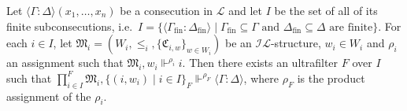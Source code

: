 \documentclass[submission,copyright,creativecommons]{eptcs}
\newcommand{\mo}{\mathfrak}
\newcommand{\finset}{_\mathrm{fin}}
\newcommand{\IL}{\mathscr{I\!\!L}}   %
\newcommand{\LL}{\mathcal{L}}        %
\newcommand{\consec}[2]{\langle #1:#2 \rangle}
\newcommand{\satisfySym}{\Vdash}
\newcommand{\satisfy}[4]{#1, #2 \satisfySym^{#4} #3}
\begin{document}
\begin{theorem}\label{compactness}
  Let $\consec{\Gamma}{\Delta}(x_1,\ldots,x_n)$
  be a consecution in $\LL$ and let $I$ be the set of all of its finite sub\-con\-se\-cu\-tions, i.e.~$
    I = \{ \consec{\Gamma\finset}{\Delta\finset} \mid \Gamma\finset \subseteq \Gamma \text{ and } \Delta\finset \subseteq \Delta \text{ are finite} \}.
  $
  For each $i \in I$, let $\mo{M}_i = (W_i, {\leq_i,} \{ \mo{C}_{i, w} \}_{w \in W_i})$
  be an $\IL$-structure, $w_i \in W_i$
  and $\rho_i$ an assignment such that $\satisfy{\mo{M}_i}{w_i}{i}{\rho_i}$. 
  Then there exists an ultrafilter $F$ over $I$ such that
  $\satisfy{\prod_{i \in I}^F \mo{M}_i}{ \{ (i, w_i) \mid i \in I \}_F}{\consec{\Gamma}{\Delta}}{\rho_F}$,
  where $\rho_F$ is the product assignment of the $\rho_i$.
\end{theorem}
\end{document}
